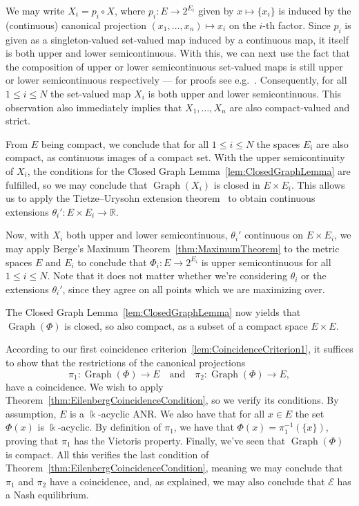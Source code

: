 \documentclass[a4paper,11pt,reqno,english]{amsart}
\theoremstyle{definition}
\begin{document}
We may write $X_i = p_i\circ X$, where $p_i\colon E\longrightarrow 2^{E_i}$ given by $x\longmapsto\{x_i\} $ is induced by the (continuous) canonical projection $(x_1,\dots,x_n)\longmapsto x_i$ on the $i$-th factor. Since $p_i$ is given as a singleton-valued set-valued map induced by a continuous map, it itself is both upper and lower semicontinuous. With this, we can next use the fact that the composition of upper or lower semicontinuous set-valued maps is still upper or lower semicontinuous respectively --- for proofs see e.g.~\cite[Def. 1.3.2 ff.]{Aubin_Frankowska_2009}. Consequently, for all $1\leq i \leq N$ the set-valued map $X_i$ is both upper and lower semicontinuous. This observation also immediately implies that $X_1,\dots,X_n$ are also compact-valued and strict.

From $E$ being compact, we conclude that for all $1\leq i \leq N$ the spaces $E_i$ are also compact, as continuous images of a compact set. With the upper semicontinuity of $X_i$, the conditions for the Closed Graph Lemma~\ref{lem:ClosedGraphLemma} are fulfilled, so we may conclude that $\operatorname{Graph}(X_i)$ is closed in $E\times E_i$. This allows us to apply the Tietze--Urysohn extension theorem~\cite[Thm.\,35.1]{Munkres2000} to obtain continuous extensions $\theta_i'\colon E\times E_i\longrightarrow\mathbb{R}$.

Now, with $X_i$ both upper and lower semicontinuous, $\theta_i'$ continuous on $E\times E_i$, we may apply Berge's Maximum Theorem~\ref{thm:MaximumTheorem} to the metric spaces $E$ and $E_i$ to conclude that $\Phi_i\colon E\longrightarrow 2^{E_i}$ is upper semicontinuous for all $1\leq i \leq N$. Note that it does not matter whether we're considering $\theta_i$ or the extensions $\theta_i'$, since they agree on all points which we are maximizing over.

The Closed Graph Lemma~\ref{lem:ClosedGraphLemma} now yields that $\operatorname{Graph}(\Phi)$ is closed, so also compact, as a subset of a compact space $E\times E$.

\medskip According to our first coincidence criterion~\ref{lem:CoincidenceCriterion1}, it suffices to show that the restrictions of the canonical projections
\begin{displaymath}
	\pi_1 \colon \operatorname{Graph}(\Phi)\longrightarrow E \quad \text{and}\quad \pi_2 \colon \operatorname{Graph}(\Phi)\longrightarrow E,
\end{displaymath}
have a coincidence. We wish to apply Theorem~\ref{thm:EilenbergCoincidenceCondition}, so we verify its conditions. By assumption, $E$ is a $\Bbbk$-acyclic ANR. We also have that for all $x\in E$ the set $\Phi(x)$ is $\Bbbk$-acyclic. By definition of $\pi_1$, we have that $\Phi(x)=\pi_1^{-1}(\{x\})$, proving that $\pi_1$ has the Vietoris property. Finally, we've seen that $\operatorname{Graph}(\Phi)$ is compact. All this verifies the last condition of Theorem~\ref{thm:EilenbergCoincidenceCondition}, meaning we may conclude that $\pi_1$ and $\pi_2$ have a coincidence, and, as explained, we may also conclude that $\mathcal{E}$ has a Nash equilibrium.
\end{document}
